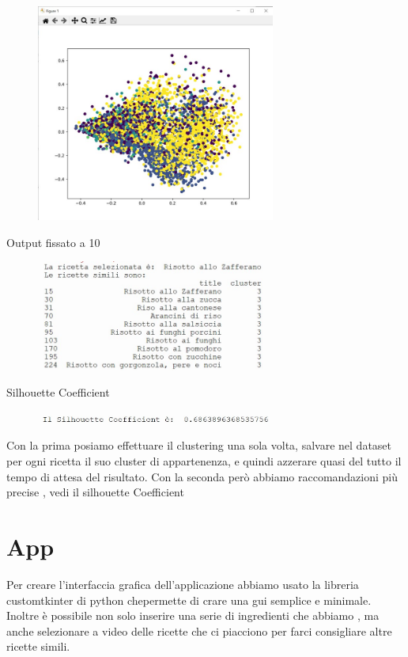 \documentclass[12pt]{report}
\begin{document}
\begin{figure}[H]
        \centering
        {\includegraphics[width=0.7\textwidth]{img/img26.jpg}}
\end{figure}

Output fissato a 10

\begin{figure}[H]
        \centering
        {\includegraphics[width=0.7\textwidth]{img/img27.jpg}}
\end{figure}

Silhouette Coefficient

\begin{figure}[H]
        \centering
        {\includegraphics[width=0.7\textwidth]{img/img29.jpg}}
\end{figure}

Con la prima posiamo effettuare il clustering una sola volta, salvare nel dataset per ogni ricetta il suo cluster di appartenenza, e quindi azzerare quasi del tutto il tempo di attesa del risultato.
Con la seconda però abbiamo raccomandazioni più precise , vedi il silhouette Coefficient

\chapter{App}
Per creare l’interfaccia grafica dell’applicazione abbiamo usato la libreria customtkinter di python chepermette di crare una gui semplice e minimale. Inoltre è possibile non solo inserire una serie di ingredienti che abbiamo , ma anche selezionare a video delle ricette che ci piacciono per farci consigliare altre ricette simili. 
\end{document}
